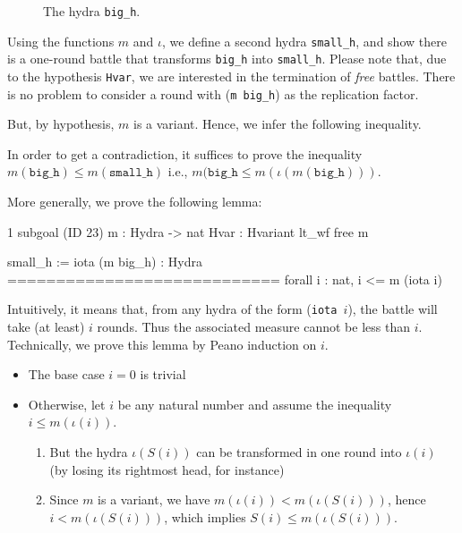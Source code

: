 \begin{figure}[htb]
\centering
{}
\caption{\label{fig:h-omega-omega}}
 The hydra \texttt{big\_h}.
\end{figure}




 Using the functions $m$ and $\iota$, we define a second hydra \texttt{small\_h}, and show
 there is a one-round battle that transforms \texttt{big\_h} into \texttt{small\_h}. Please note that,
due to the hypothesis \texttt{Hvar}, we are interested in the termination of \emph{free} battles. 
There is no problem to consider a round with (\texttt{m big\_h}) as the replication factor.





 
But, by hypothesis, $m$ is a variant. Hence, we infer the following inequality.

\vspace{4pt}




In order to get a contradiction, it suffices to  prove the inequality
$m(\texttt{big\_h}) \leq m(\texttt{small\_h})$ i.e.,  $m(\texttt{big\_h}\leq m(\iota (m(\texttt{big\_h})))$.

More generally, we prove the following lemma: 



\begin{Coqanswer}
1 subgoal (ID 23)
  m : Hydra -> nat
  Hvar : Hvariant lt_wf free m
 
  small_h := iota (m big_h) : Hydra
  ============================
  forall i : nat, i <= m (iota i)
\end{Coqanswer}

Intuitively, it means that, from any hydra of the form (\texttt{iota $i$}), the battle will 
take (at least) $i$ rounds. Thus the associated measure cannot be less than $i$.
Technically, we prove this lemma by Peano induction on $i$.

\begin{itemize}
\item The base case $i=0$ is trivial
\item Otherwise, let $i$ be any natural number and assume  the inequality
  $i \leq m(\iota(i))$.
  \begin{enumerate}
  \item  But the hydra $\iota(S(i))$ can be transformed in one round into
    $\iota(i)$ (by losing its rightmost head, for instance)
  \item Since $m$ is a variant, we have $m(\iota(i)) < m(\iota(S(i)))$,
    hence  $i< m(\iota(S(i)))$, which implies  $S(i)\leq  m(\iota(S(i)))$.
  \end{enumerate}
\end{itemize}

